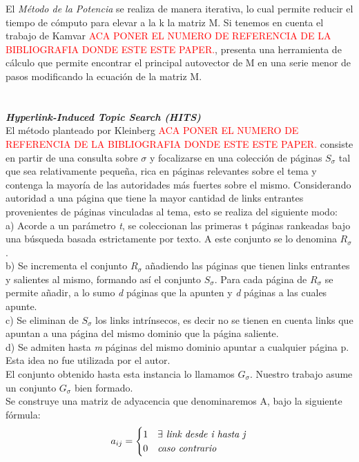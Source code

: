 \documentclass[a4paper]{article}
\begin{document}
\indent El\emph{ M\'etodo de la Potencia} se realiza de manera iterativa, lo cual permite reducir el tiempo de c\'omputo para elevar a la k la matriz M. Si tenemos en cuenta el trabajo de Kamvar \textcolor{red}{ACA PONER EL NUMERO DE REFERENCIA DE LA BIBLIOGRAFIA DONDE ESTE ESTE PAPER.}, presenta una herramienta de c\'alculo que permite encontrar el principal autovector de M en una serie menor de pasos modificando la ecuaci\'on de la matriz M.\\
\\
\\
\indent \indent \emph{\textbf{Hyperlink-Induced Topic Search (HITS)}} \\
\indent El m\'etodo planteado por Kleinberg \textcolor{red}{ACA PONER EL NUMERO DE REFERENCIA DE LA BIBLIOGRAFIA DONDE ESTE ESTE PAPER.} consiste en partir de una consulta sobre $\sigma$ y focalizarse en una colecci\'on de p\'aginas $S_\sigma$ tal que sea relativamente peque\~na,  rica en p\'aginas relevantes sobre el tema y contenga la mayor\'ia de las autoridades m\'as fuertes sobre el mismo. Considerando autoridad a una p\'agina que tiene la mayor cantidad de links entrantes provenientes de p\'aginas vinculadas al tema, esto se realiza del siguiente modo:\\
a) Acorde a un par\'ametro \emph{t}, se coleccionan las primeras t p\'aginas rankeadas bajo una b\'usqueda basada estrictamente por texto. A este conjunto se lo denomina $R_\sigma$. \\
b) Se incrementa el conjunto $R_\sigma$ a\~nadiendo las p\'aginas que tienen links entrantes y salientes al mismo, formando as\'i el conjunto $S_\sigma$. Para cada p\'agina de $R_\sigma$ se permite a\~nadir, a lo sumo \emph{d} p\'aginas que la apunten y \emph{d} p\'aginas a las cuales apunte. \\
c) Se eliminan de $S_\sigma$ los links intr\'insecos, es decir no se tienen en cuenta links que apuntan a una p\'agina del mismo dominio que la p\'agina saliente. \\
d) Se admiten hasta \emph{m} p\'aginas del mismo dominio apuntar a cualquier p\'agina p. Esta idea no fue utilizada por el autor. \\
\indent El conjunto obtenido hasta esta instancia lo llamamos $G_\sigma$. Nuestro trabajo asume un conjunto $G_\sigma$ bien formado.\\
\indent Se construye una matriz de adyacencia que denominaremos A, bajo la siguiente f\'ormula:
\[
   a_{ij} = 
   \begin{cases} 
      1              & \exists$\textit{ link desde i hasta j}$   \\
      0 & $\textit{caso contrario}$
   \end{cases}
\]
\end{document}
